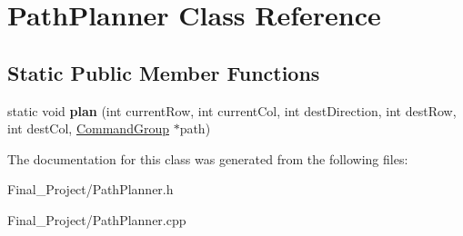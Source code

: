\hypertarget{classPathPlanner}{\section{Path\-Planner Class Reference}
\label{classPathPlanner}
}
\subsection*{Static Public Member Functions}
\begin{DoxyCompactItemize}
\item 
\hypertarget{classPathPlanner_a8c4f45c86381a249df76844df7a6e2ce}{static void {\bfseries plan} (int current\-Row, int current\-Col, int dest\-Direction, int dest\-Row, int dest\-Col, \hyperlink{classCommandGroup}{Command\-Group} $\ast$path)}\label{classPathPlanner_a8c4f45c86381a249df76844df7a6e2ce}

\end{DoxyCompactItemize}


The documentation for this class was generated from the following files\-:\begin{DoxyCompactItemize}
\item 
Final\-\_\-\-Project/Path\-Planner.\-h\item 
Final\-\_\-\-Project/Path\-Planner.\-cpp\end{DoxyCompactItemize}
